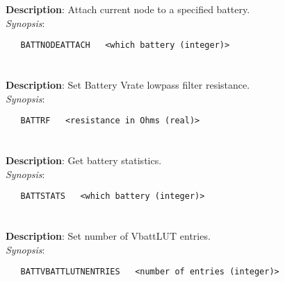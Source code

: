 \section{\quad{}}
\label{manpages:BATTNODEATTACH}
\label{manpages:battnodeattach}
\vspace{-0.1in}
{\bf Description}: 	Attach current node to a specified battery.\\[1.5ex]
{\em Synopsis}:
\vspace{-0.05in}
\scriptsize
\begin{lstlisting}
   BATTNODEATTACH   <which battery (integer)>						
\end{lstlisting}
\normalsize
\vspace{-0.05in}


\section{\quad{}}
\label{manpages:BATTRF}
\label{manpages:battrf}
\vspace{-0.1in}
{\bf Description}: 	Set Battery Vrate lowpass filter resistance.\\[1.5ex]
{\em Synopsis}:
\vspace{-0.05in}
\scriptsize
\begin{lstlisting}
   BATTRF   <resistance in Ohms (real)>																
\end{lstlisting}
\normalsize
\vspace{-0.05in}


\section{\quad{}}
\label{manpages:BATTSTATS}
\label{manpages:battstats}
\vspace{-0.1in}
{\bf Description}: 	Get battery statistics.\\[1.5ex]
{\em Synopsis}:
\vspace{-0.05in}
\scriptsize
\begin{lstlisting}
   BATTSTATS   <which battery (integer)>								
\end{lstlisting}
\normalsize
\vspace{-0.05in}


\section{\quad{}}
\label{manpages:BATTVBATTLUTNENTRIES}
\label{manpages:battvbattlutnentries}
\vspace{-0.1in}
{\bf Description}: 	Set number of VbattLUT entries.\\[1.5ex]
{\em Synopsis}:
\vspace{-0.05in}
\scriptsize
\begin{lstlisting}
   BATTVBATTLUTNENTRIES   <number of entries (integer)>																		
\end{lstlisting}
\normalsize
\vspace{-0.05in}


